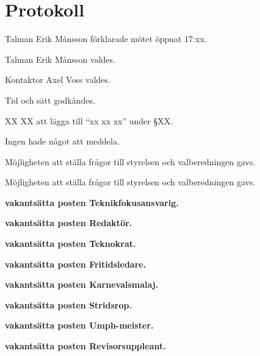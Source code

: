\documentclass[10pt]{article}
\def\mo{Erik Månsson}
\def\ms{Axel Voss}
\begin{document}
\section*{Protokoll}
\begin{paragrafer}
Talman {\mo} förklarade mötet öppnat 17:xx.

Talman {\mo} valdes.

Kontaktor {\ms} valdes.

Tid och sätt godkändes.

\valavj

\ingaadj

XX XX \ypa att lägga till ``xx xx xx'' under \S XX.



Ingen hade något att meddela.


Möjligheten att ställa frågor till styrelsen och valberedningen gavs.

Möjligheten att ställa frågor till styrelsen och valberedningen gavs.



\begin{paragrafer}


\textbf{\Mba vakantsätta posten Teknikfokusansvarig.}\par

\textbf{\Mba vakantsätta posten Redaktör.}\par

\textbf{\Mba vakantsätta posten Teknokrat.}\par

\textbf{\Mba vakantsätta posten Fritidsledare.}\par

\textbf{\Mba vakantsätta posten Karnevalsmalaj.}\par

\textbf{\Mba vakantsätta posten Stridsrop.}\par

\textbf{\Mba vakantsätta posten Umph-meister.}\par

\textbf{\Mba vakantsätta posten Revisorsuppleant.}\par
\end{paragrafer}
\end{paragrafer}
\end{document}
